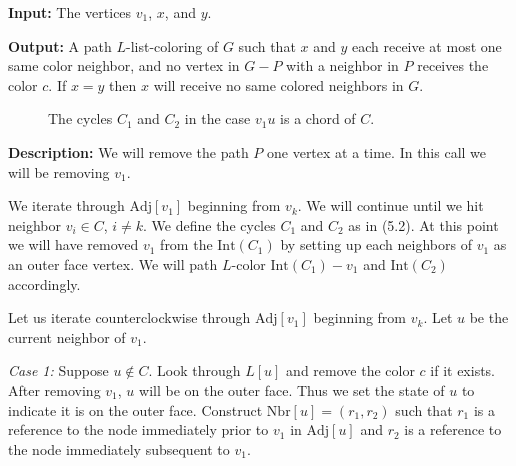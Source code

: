 \documentclass[letterpaper, 12pt]{article}
\theoremstyle{definition}
\theoremstyle{definition}
\theoremstyle{thm}
\theoremstyle{definition}
\begin{document}
\noindent\textbf{Input:} The vertices $v_1$, $x$, and $y$.

\noindent\textbf{Output:} A path $L$-list-coloring of $G$ such that $x$ and
$y$ each receive at most one same color neighbor, and no vertex in
$G-P$ with a neighbor in $P$ receives the color $c$. If $x=y$ then $x$ will
receive no same colored neighbors in $G$.

\begin{figure}
\begin{center}
\end{center}

\caption{The cycles $C_1$ and $C_2$ in the case $v_1u$ is a chord of $C$.}
\end{figure}

\noindent\textbf{Description:} We will remove the path $P$ one vertex at a
time. In this call we will be removing $v_1$.

We iterate through $\text{Adj}[v_1]$ beginning from $v_k$. We will continue
until we hit neighbor $v_i\in C$, $i\ne k$. We define the cycles $C_1$ and $C_2$
as in (5.2). At this point we will have removed $v_1$ from the $\text{Int}(C_1)$
by setting up each neighbors of $v_1$ as an outer face vertex. We will path
$L$-color $\text{Int}(C_1)-v_1$ and $\text{Int}(C_2)$ accordingly.

Let us iterate counterclockwise through $\text{Adj}[v_1]$ beginning from $v_k$.
Let $u$ be the current neighbor of $v_1$.

\textit{Case 1:} Suppose $u\not\in C$. Look through $L[u]$ and remove the color
$c$ if it exists. After removing $v_1$, $u$ will be on the
outer face. Thus we set the state of $u$ to indicate it is
on the outer face. Construct $\text{Nbr}[u]=(r_1,r_2)$ such that
$r_1$ is a reference to the node immediately prior to $v_1$ in $\text{Adj}[u]$
and $r_2$ is a reference to the node immediately subsequent to $v_1$.
\end{document}
